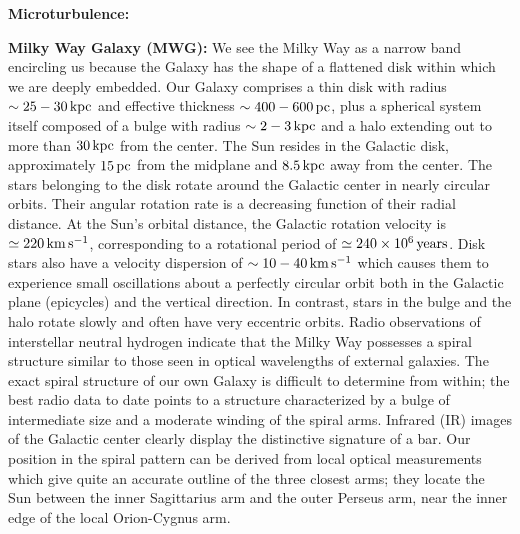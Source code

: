 \documentclass[a4paper,10pt]{article}
\begin{document}
{\noindent}\textbf{Microturbulence:}

{\noindent}\textbf{Milky Way Galaxy (MWG):} We see the Milky Way as a narrow band encircling us because the Galaxy has the shape of a flattened disk within which we are deeply embedded. Our Galaxy comprises a thin disk with radius $\sim25-30\,{\rm kpc}$ and effective thickness $\sim400-600\,{\rm pc}$, plus a spherical system itself composed of a bulge with radius $\sim2-3\,{\rm kpc}$ and a halo extending out to more than $30\,{\rm kpc}$ from the center. The Sun resides in the Galactic disk, approximately $15\,{\rm pc}$ from the midplane and $8.5\,{\rm kpc}$ away from the center. The stars belonging to the disk rotate around the Galactic center in nearly circular orbits. Their angular rotation rate is a decreasing function of their radial distance. At the Sun's orbital distance, the Galactic rotation velocity is $\simeq220\,{\rm km\,s^{-1}}$, corresponding to a rotational period of $\simeq240\times10^6\,{\rm years}$. Disk stars also have a velocity dispersion of $\sim10-40\,{\rm km\,s^{-1}}$ which causes them to experience small oscillations about a perfectly circular orbit both in the Galactic plane (epicycles) and the vertical direction. In contrast, stars in the bulge and the halo rotate slowly and often have very eccentric orbits. Radio observations of interstellar neutral hydrogen indicate that the Milky Way possesses a spiral structure similar to those seen in optical wavelengths of external galaxies. The exact spiral structure of our own Galaxy is difficult to determine from within; the best radio data to date points to a structure characterized by a bulge of intermediate size and a moderate winding of the spiral arms. Infrared (IR) images of the Galactic center clearly display the distinctive signature of a bar. Our position in the spiral pattern can be derived from local optical measurements which give quite an accurate outline of the three closest arms; they locate the Sun between the inner Sagittarius arm and the outer Perseus arm, near the inner edge of the local Orion-Cygnus arm.
\end{document}
